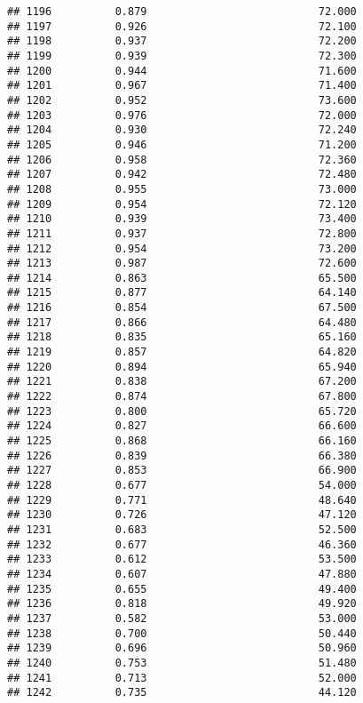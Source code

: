 \documentclass[
]{article}
\begin{document}
\begin{verbatim}
## 1196          0.879                           72.000
## 1197          0.926                           72.100
## 1198          0.937                           72.200
## 1199          0.939                           72.300
## 1200          0.944                           71.600
## 1201          0.967                           71.400
## 1202          0.952                           73.600
## 1203          0.976                           72.000
## 1204          0.930                           72.240
## 1205          0.946                           71.200
## 1206          0.958                           72.360
## 1207          0.942                           72.480
## 1208          0.955                           73.000
## 1209          0.954                           72.120
## 1210          0.939                           73.400
## 1211          0.937                           72.800
## 1212          0.954                           73.200
## 1213          0.987                           72.600
## 1214          0.863                           65.500
## 1215          0.877                           64.140
## 1216          0.854                           67.500
## 1217          0.866                           64.480
## 1218          0.835                           65.160
## 1219          0.857                           64.820
## 1220          0.894                           65.940
## 1221          0.838                           67.200
## 1222          0.874                           67.800
## 1223          0.800                           65.720
## 1224          0.827                           66.600
## 1225          0.868                           66.160
## 1226          0.839                           66.380
## 1227          0.853                           66.900
## 1228          0.677                           54.000
## 1229          0.771                           48.640
## 1230          0.726                           47.120
## 1231          0.683                           52.500
## 1232          0.677                           46.360
## 1233          0.612                           53.500
## 1234          0.607                           47.880
## 1235          0.655                           49.400
## 1236          0.818                           49.920
## 1237          0.582                           53.000
## 1238          0.700                           50.440
## 1239          0.696                           50.960
## 1240          0.753                           51.480
## 1241          0.713                           52.000
## 1242          0.735                           44.120

\end{verbatim}
\end{document}
